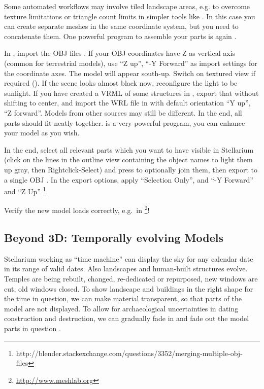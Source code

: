 Some automated workflows may involve tiled landscape areas, e.g. to
overcome texture limitations or triangle count limits in simpler tools
like . In this case you can create separate meshes
in the same coordinate system, but you need to concatenate them. One
powerful program to assemble your parts is again .

In , import the OBJ files . If your OBJ coordinates have Z as vertical axis (common for
terrestrial models), use ``Z up'', ``-Y Forward'' as import settings
for the coordinate axes. The model will appear south-up.  Switch on
textured view if required (). If the scene looks almost
black now, reconfigure the light to be sunlight. If you have created a
VRML of some structures in , export that without
shifting to center, and import the WRL file in  with
default orientation ``Y up'', ``Z forward''. Models from other sources
may still be different. In the end, all parts should fit neatly
together.  is a very powerful program, you can
enhance your model as you wish.

In the end, select all relevant parts which you want to have visible
in Stellarium (click on the lines in the outline view containing the
object names to light them up gray, then Rightclick-Select) and press
 to optionally join them, then export to a single OBJ
. In the export options, apply
``Selection Only'', and ``-Y Forward'' and ``Z Up''%
\footnote{http://blender.stackexchange.com/questions/3352/merging-multiple-obj-files}.

Verify the new model loads correctly, e.g.\ in \footnote{\url{http://www.meshlab.org}}!

\subsection{Beyond 3D: Temporally evolving Models}
\label{sec:scenery3d:Beyond3D}

Stellarium  working as ``time machine'' can display the sky for any calendar date in its range of valid dates. 
Also landscapes and human-built structures evolve. Temples are being rebuilt, changed, re-dedicated or repurposed, 
new windows are cut, old windows closed. 
To show landscape and buildings in the right shape for the time in question, we can make material transparent, 
so that parts of the model are not displayed.  To allow for archaeological uncertainties in dating 
construction and destruction, we can gradually fade in and fade out the model parts in question \citep{Zotti:SEAC2017}.


